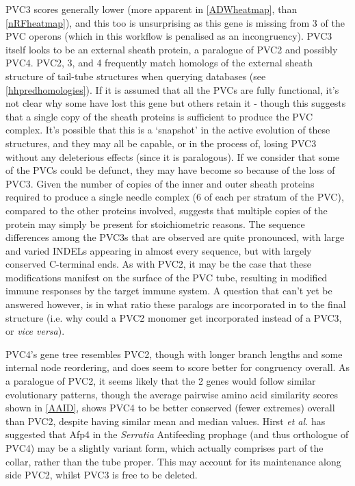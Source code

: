 PVC3 scores generally lower (more apparent in \vref{ADWheatmap}, than \vref{nRFheatmap}), and this too is unsurprising as this gene is missing from 3 of the PVC operons (which in this workflow is penalised as an incongruency). PVC3 itself looks to be an external sheath protein, a paralogue of PVC2 and possibly PVC4. PVC2, 3, and 4 frequently match homologs of the external sheath structure of tail-tube structures when querying databases (see \vref{hhpredhomologies}). If it is assumed that all the PVCs are fully functional, it's not clear why some have lost this gene but others retain it - though this suggests that a single copy of the sheath proteins is sufficient to produce the PVC complex. It's possible that this is a `snapshot' in the active evolution of these structures, and they may all be capable, or in the process of, losing PVC3 without any deleterious effects (since it is paralogous). If we consider that some of the PVCs could be defunct, they may have become so because of the loss of PVC3. Given the number of copies of the inner and outer sheath proteins required to produce a single needle complex (6 of each per stratum of the PVC), compared to the other proteins involved, suggests that multiple copies of the protein may simply be present for stoichiometric reasons. The sequence differences among the PVC3s that are observed are quite pronounced, with large and varied INDELs appearing in almost every sequence, but with largely conserved C-terminal ends. As with PVC2, it may be the case that these modifications manifest on the surface of the PVC tube, resulting in modified immune responses by the target immune system. A question that can't yet be answered however, is in what ratio these paralogs are incorporated in to the final structure (i.e. why could a PVC2 monomer get incorporated instead of a PVC3, or \emph{vice versa}).

PVC4's gene tree resembles PVC2, though with longer branch lengths and some internal node reordering, and does seem to score better for congruency overall. As a paralogue of PVC2, it seems likely that the 2 genes would follow similar evolutionary patterns, though the average pairwise amino acid similarity scores shown in \vref{AAID}, shows PVC4 to be better conserved (fewer extremes) overall than PVC2, despite having similar mean and median values. Hirst \emph{et al.} has suggested that Afp4 in the \emph{Serratia} Antifeeding prophage (and thus orthologue of PVC4) may be a slightly variant form, which actually comprises part of the collar, rather than the tube proper. This may account for its maintenance along side PVC2, whilst PVC3 is free to be deleted.

